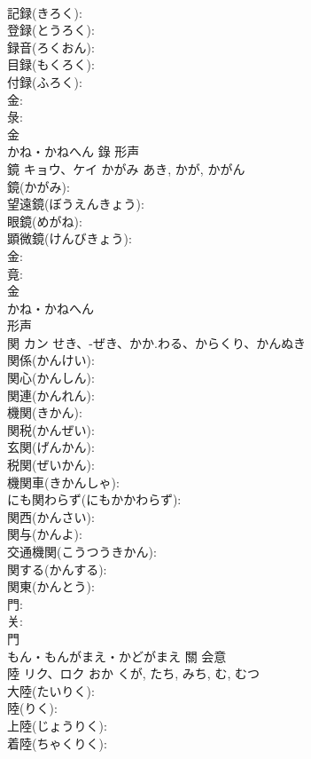 \documentclass[8pt]{extreport}
\begin{document}
\begin{CJK}{UTF8}{min}
\\	記録(きろく): 
\\	登録(とうろく): 
\\	録音(ろくおん): 
\\	目録(もくろく): 
\\	付録(ふろく): 
\\	金: 
\\	彔: 
\\	金	
\\	かね・かねへん	錄	形声 
\\	鏡	キョウ、ケイ	かがみ	あき, かが, かがん	
\\	鏡(かがみ): 
\\	望遠鏡(ぼうえんきょう): 
\\	眼鏡(めがね): 
\\	顕微鏡(けんびきょう): 
\\	金: 
\\	竟: 
\\	金	
\\	かね・かねへん	
\\	形声 
\\	関	カン	せき、-ぜき、かか.わる、からくり、かんぬき		
\\	関係(かんけい): 
\\	関心(かんしん): 
\\	関連(かんれん): 
\\	機関(きかん): 
\\	関税(かんぜい): 
\\	玄関(げんかん): 
\\	税関(ぜいかん): 
\\	機関車(きかんしゃ): 
\\	にも関わらず(にもかかわらず): 
\\	関西(かんさい): 
\\	関与(かんよ): 
\\	交通機関(こうつうきかん): 
\\	関する(かんする): 
\\	関東(かんとう): 
\\	門: 
\\	关: 
\\	門	
\\	もん・もんがまえ・かどがまえ	關	会意 
\\	陸	リク、ロク	おか	くが, たち, みち, む, むつ	
\\	大陸(たいりく): 
\\	陸(りく): 
\\	上陸(じょうりく): 
\\	着陸(ちゃくりく): 

\end{CJK}
\end{document}
